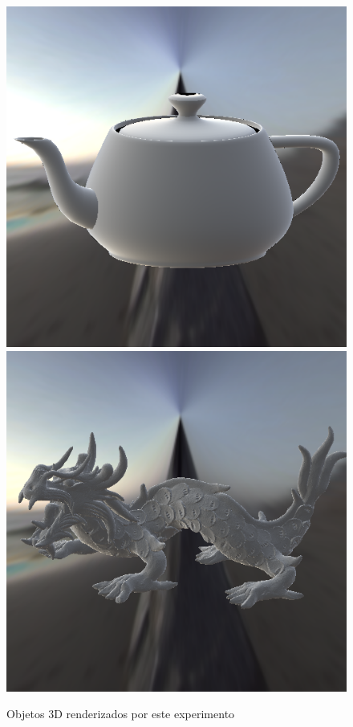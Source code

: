 \begin{figure}[H]
    \caption{\small{Objetos 3D renderizados por este experimento}}\label{fig-duer-eqlang}
  \includegraphics[width=\linewidth]{./Imagens/brdfs/duer-teapot.png}
\endminipage\hfill
{}
  \includegraphics[width=\linewidth]{./Imagens/brdfs/duer-dragon.png}

\end{figure}
